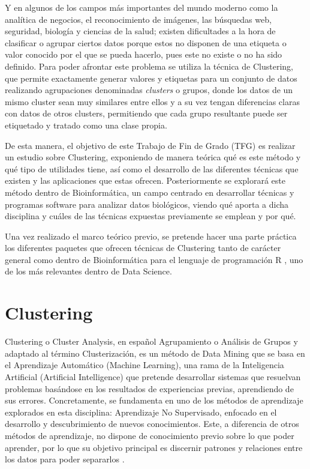 \documentclass[3p,twocolumn]{elsarticle}
\begin{document}
Y en algunos de los campos más importantes del mundo moderno como la analítica de negocios, el reconocimiento de imágenes, las búsquedas web, seguridad, biología y ciencias de la salud; existen dificultades a la hora de clasificar o agrupar ciertos datos porque estos no disponen de una etiqueta o valor conocido por el que se pueda hacerlo, pues este no existe o no ha sido definido. Para poder afrontar este problema se utiliza la técnica de Clustering, que permite exactamente generar valores y etiquetas para un conjunto de datos realizando agrupaciones denominadas \textit{clusters} o grupos, donde los datos de un mismo cluster sean muy similares entre ellos y a su vez tengan diferencias claras con datos de otros clusters, permitiendo que cada grupo resultante puede ser etiquetado y tratado como una clase propia.

De esta manera, el objetivo de este Trabajo de Fin de Grado (TFG) es realizar un estudio sobre Clustering, exponiendo de manera teórica qué es este método y qué tipo de utilidades tiene, así como el desarrollo de las diferentes técnicas que existen y las aplicaciones que estas ofrecen. Posteriormente se explorará este método dentro de Bioinformática, un campo centrado en desarrollar técnicas y programas software para analizar datos biológicos, viendo qué aporta a dicha disciplina y cuáles de las técnicas expuestas previamente se emplean y por qué. 

Una vez realizado el marco teórico previo, se pretende hacer una parte práctica los diferentes paquetes que ofrecen técnicas de Clustering tanto de carácter general como dentro de Bioinformática para el lenguaje de programación R \cite{6}, uno de los más relevantes dentro de Data Science.




\section{Clustering} 

Clustering o Cluster Analysis, en español Agrupamiento o Análisis de Grupos y adaptado al término Clusterización, es un método de Data Mining que se basa en el Aprendizaje Automático (Machine Learning), una rama de la Inteligencia Artificial (Artificial Intelligence) que pretende desarrollar sistemas que resuelvan problemas basándose en los resultados de experiencias previas, aprendiendo de sus errores. Concretamente, se fundamenta en uno de los métodos de aprendizaje explorados en esta disciplina: Aprendizaje No Supervisado, enfocado en el desarrollo y descubrimiento de nuevos conocimientos. Este, a diferencia de otros métodos de aprendizaje, no dispone de conocimiento previo sobre lo que poder aprender, por lo que su objetivo principal es discernir patrones y relaciones entre los datos para poder separarlos \cite{7}.
\end{document}

